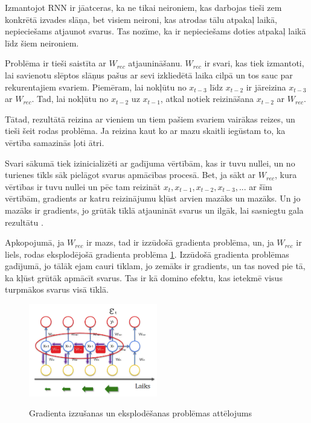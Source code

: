 \documentclass[12pt,paper=A4]{report}
\begin{document}
Izmantojot RNN ir jāatceras, ka ne tikai neironiem, kas darbojas tieši zem konkrētā izvades slāņa, bet visiem neironi, kas atrodas tālu atpakaļ laikā, nepieciešams atjaunot svarus. Tas nozīme, ka ir nepieciešams doties atpakaļ laikā līdz šiem neironiem. 

Problēma ir tieši saistīta ar $W_{rec}$ atjaunināšanu. $W_{rec}$ ir svari, kas tiek izmantoti, lai savienotu slēptos slāņus pašus ar sevi izkliedētā laika cilpā un tos sauc par rekurentajiem svariem. Piemēram, lai nokļūtu no $x_{t-3}$ līdz $x_{t-2}$ ir  jāreizina $x_{t-3}$ ar $W_{rec}$. Tad, lai nokļūtu no $x_{t-2}$ uz $x_{t-1}$, atkal notiek reizināšana $x_{t-2}$ ar $W_{rec}$. 

Tātad, rezultātā reizina ar vieniem un tiem pašiem svariem vairākas reizes, un tieši šeit rodas problēma. Ja reizina kaut ko ar mazu skaitli iegūstam to, ka vērtība samazinās ļoti ātri. 

Svari sākumā tiek izinicializēti ar gadījuma vērtībām, kas ir tuvu nullei, un no turienes tīkls sāk pielāgot svarus apmācības procesā. Bet, ja sākt ar $W_{rec}$, kura vērtības ir tuvu nullei un pēc tam reizināt $x_t, x_{t-1}, x_{t-2}, x_{t-3}, ...$ ar šīm vērtībām, gradients ar katru reizinājumu kļūst arvien mazāks un mazāks. Un jo mazāks ir gradients, jo grūtāk tīklā atjaunināt svarus un ilgāk, lai sasniegtu gala rezultātu \cite{https://www.superdatascience.com/recurrent-neural-networks-rnn-the-vanishing-gradient-problem/}. 

Apkopojumā, ja $W_{rec}$ ir mazs, tad ir izzūdošā gradienta problēma, un, ja $W_{rec}$ ir liels, rodas eksplodējošā gradienta problēma  \ref{exploadingGradient}. Izzūdošā gradienta problēmas gadījumā, jo tālāk ejam cauri tīklam, jo zemāks ir gradients, un tas noved pie tā, ka kļūst grūtāk apmācīt svarus. Tas ir kā domino efektu, kas ietekmē visus turpmākos svarus visā tīklā.


\begin{figure}[H] \centering
\includegraphics[width=0.50\textwidth]{GradientIssue} 
\caption{Gradienta izzušanas un eksplodēšanas problēmas attēlojums}
\cite{https://www.superdatascience.com/recurrent-neural-networks-rnn-the-vanishing-gradient-problem}
  \label{exploadingGradient} 
\end{figure}
\end{document}
